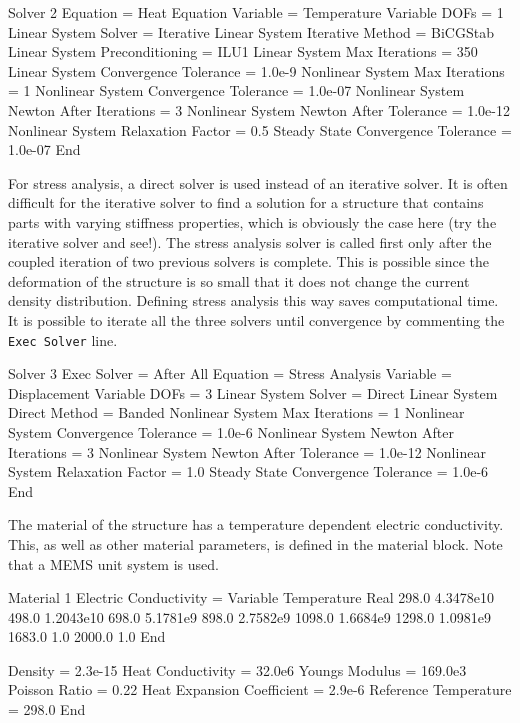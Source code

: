Solver 2
   Equation = Heat Equation
   Variable = Temperature
   Variable DOFs = 1
   Linear System Solver = Iterative
   Linear System Iterative Method = BiCGStab
   Linear System Preconditioning = ILU1
   Linear System Max Iterations = 350
   Linear System Convergence Tolerance = 1.0e-9
   Nonlinear System Max Iterations = 1
   Nonlinear System Convergence Tolerance = 1.0e-07
   Nonlinear System Newton After Iterations = 3
   Nonlinear System Newton After Tolerance = 1.0e-12
   Nonlinear System Relaxation Factor = 0.5
   Steady State Convergence Tolerance = 1.0e-07
End
\ttend

For stress analysis, a direct solver is used instead of an iterative
solver. It is often difficult for the iterative solver to find a
solution for a structure that contains parts with varying stiffness
properties, which is obviously the case here (try the iterative solver
and see!). The stress analysis solver is called first only after the
coupled iteration of two previous solvers is complete. This is
possible since the deformation of the structure is so small that it
does not change the current density distribution. Defining stress
analysis this way saves computational time. It is possible to
iterate all the three solvers until convergence by commenting the
\texttt{Exec Solver} line.

\ttbegin
Solver 3
  Exec Solver = After All
  Equation = Stress Analysis
  Variable = Displacement
  Variable DOFs = 3
  Linear System Solver = Direct
  Linear System Direct Method = Banded
  Nonlinear System Max Iterations = 1
  Nonlinear System Convergence Tolerance = 1.0e-6
  Nonlinear System Newton After Iterations = 3
  Nonlinear System Newton After Tolerance = 1.0e-12
  Nonlinear System Relaxation Factor = 1.0
  Steady State Convergence Tolerance = 1.0e-6
End
\ttend

The material of the structure has a temperature dependent electric
conductivity. This, as well as other material parameters, is defined
in the material block. Note that a MEMS unit system is used.

\ttbegin
Material 1
  Electric Conductivity = Variable Temperature
      Real
        298.0   4.3478e10
        498.0   1.2043e10
        698.0   5.1781e9
        898.0   2.7582e9
        1098.0  1.6684e9
        1298.0  1.0981e9
        1683.0  1.0
        2000.0  1.0
      End

  Density = 2.3e-15
  Heat Conductivity = 32.0e6
  Youngs Modulus = 169.0e3
  Poisson Ratio = 0.22
  Heat Expansion Coefficient = 2.9e-6
  Reference Temperature = 298.0
End
\ttend


